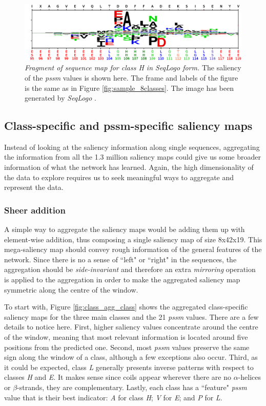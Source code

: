 \begin{figure}
	\centering
	\includegraphics[width=1\linewidth]{Figures/sample_Hclass}
	\caption{\textit{Fragment of sequence map for class H in SeqLogo form.} The saliency of the \textit{pssm} values is shown here. The frame and labels of the figure is the same as in Figure \ref{fig:sample_8classes}. The image has been generated by \textit{SeqLogo} \cite{Thomsen2012}.}
	\label{fig:sample_Hclass}
\end{figure}



\subsection{Class-specific and pssm-specific saliency maps}
Instead of looking at the saliency information along single sequences, aggregating the information from all the 1.3 million saliency maps could give us some broader information of what the network has learned. Again, the high dimensionality of the data to explore requires us to seek meaningful ways to aggregate and represent the data.

\subsubsection*{Sheer addition} \label{sect:sheer}
A simple way to aggregate the saliency maps would be adding them up with element-wise addition, thus composing a single saliency map of size 8x42x19. This mega-saliency map should convey rough information of the general features of the network. Since there is no a sense of ``left" or ``right" in the sequences, the aggregation should be \textit{side-invariant} and therefore an extra \textit{mirroring} operation is applied to the aggregation in order to make the aggregated saliency map symmetric along the centre of the window.

To start with, Figure \ref{fig:class_agg_class} shows the aggregated class-specific saliency maps for the three main classes and the 21 \textit{pssm} values. There are a few details to notice here. First, higher saliency values concentrate around the centre of the window, meaning that most relevant information is located around five positions from the predicted one. Second, most \textit{pssm} values preserve the same sign along the window of a class, although a few exceptions also occur. Third, as it could be expected, class \textit{L} generally presents inverse patterns with respect to classes \textit{H} and \textit{E}. It makes sense since coils appear wherever there are no $\alpha$-helices or $\beta$-strands, they are complementary. Lastly, each class has a ``feature" \textit{pssm} value that is their best indicator: \textit{A} for class \textit{H}; \textit{V} for \textit{E}; and \textit{P} for \textit{L}.

